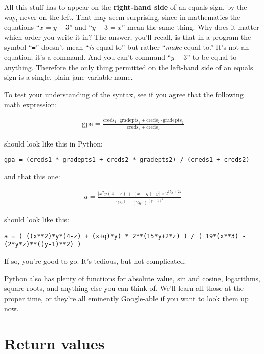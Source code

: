 All this stuff has to appear on the \textbf{right-hand side} of an equals sign,
by the way, never on the left. That may seem surprising, since in mathematics
the equations ``$x = y + 3$'' and ``$y + 3 = x$'' mean the same thing. Why does
it matter which order you write it in? The answer, you'll recall, is that in a
program the symbol ``\texttt{=}'' doesn't mean ``\textit{is} equal to'' but
rather ``\textit{make} equal to.'' It's not an equation; it's a command. And
you can't command ``$y+3$'' to be equal to anything. Therefore the only thing
permitted on the left-hand side of an equals sign is a single, plain-jane
variable name.

To test your understanding of the syntax, see if you agree that the following
math expression:

\begin{align*}
\textrm{gpa} = \frac{
\textrm{creds}_1 \cdot \textrm{gradepts}_1 +
\textrm{creds}_2 \cdot \textrm{gradepts}_2}
{\textrm{creds}_1 + \textrm{creds}_2}
\end{align*}

should look like this in Python:

\begin{Verbatim}[fontsize=\small,samepage=true,frame=single,framesep=3mm]
gpa = (creds1 * gradepts1 + creds2 * gradepts2) / (creds1 + creds2)
\end{Verbatim}

and that this one:

\begin{align*}
a = \frac{\lbrack x^2y(4-z) + (x+q)\cdot y \rbrack \times 2^{15y+2z}}
{19x^3 - (2yz)^{(y-1)^2}}
\end{align*}

should look like this:

\begin{Verbatim}[fontsize=\scriptsize,samepage=true,frame=single,framesep=3mm]
a = ( ((x**2)*y*(4-z) + (x+q)*y) * 2**(15*y+2*z) ) / ( 19*(x**3) - (2*y*z)**((y-1)**2) )
\end{Verbatim}

If so, you're good to go. It's tedious, but not complicated.

Python also has plenty of functions for absolute value, sin and cosine,
logarithms, square roots, and anything else you can think of. We'll learn all
those at the proper time, or they're all eminently Google-able if you want to
look them up now.


\section{Return values}

